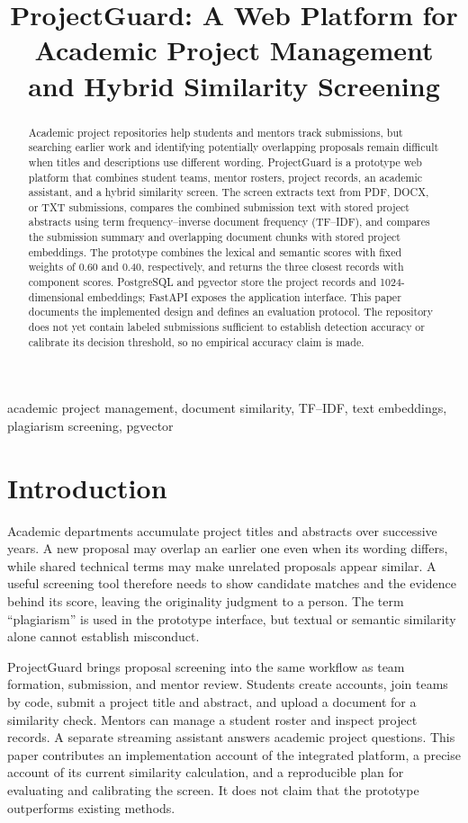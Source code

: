 \documentclass[conference]{IEEEtran}
\title{ProjectGuard: A Web Platform for Academic Project Management and Hybrid Similarity Screening}
\author{\IEEEauthorblockN{Author Name(s)}
\IEEEauthorblockA{Department and Institution\\
City, Country\\
email@example.com}}
\begin{document}
\maketitle

\begin{abstract}
Academic project repositories help students and mentors track submissions, but searching earlier work and identifying potentially overlapping proposals remain difficult when titles and descriptions use different wording. ProjectGuard is a prototype web platform that combines student teams, mentor rosters, project records, an academic assistant, and a hybrid similarity screen. The screen extracts text from PDF, DOCX, or TXT submissions, compares the combined submission text with stored project abstracts using term frequency--inverse document frequency (TF--IDF), and compares the submission summary and overlapping document chunks with stored project embeddings. The prototype combines the lexical and semantic scores with fixed weights of 0.60 and 0.40, respectively, and returns the three closest records with component scores. PostgreSQL and pgvector store the project records and 1024-dimensional embeddings; FastAPI exposes the application interface. This paper documents the implemented design and defines an evaluation protocol. The repository does not yet contain labeled submissions sufficient to establish detection accuracy or calibrate its decision threshold, so no empirical accuracy claim is made.
\end{abstract}

\begin{IEEEkeywords}
academic project management, document similarity, TF--IDF, text embeddings, plagiarism screening, pgvector
\end{IEEEkeywords}

\section{Introduction}
Academic departments accumulate project titles and abstracts over successive years. A new proposal may overlap an earlier one even when its wording differs, while shared technical terms may make unrelated proposals appear similar. A useful screening tool therefore needs to show candidate matches and the evidence behind its score, leaving the originality judgment to a person. The term ``plagiarism'' is used in the prototype interface, but textual or semantic similarity alone cannot establish misconduct.

ProjectGuard brings proposal screening into the same workflow as team formation, submission, and mentor review. Students create accounts, join teams by code, submit a project title and abstract, and upload a document for a similarity check. Mentors can manage a student roster and inspect project records. A separate streaming assistant answers academic project questions. This paper contributes an implementation account of the integrated platform, a precise account of its current similarity calculation, and a reproducible plan for evaluating and calibrating the screen. It does not claim that the prototype outperforms existing methods.
\end{document}
